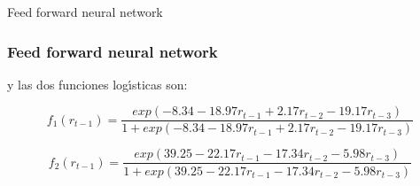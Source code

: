 \documentclass[spanish,xcolor=table]{beamer}
\begin{document}
\begin{section}{Feed forward neural network}
\begin{frame}
\frametitle{Feed forward neural network}

y las dos funciones log\'{\i}sticas son:

\begin{equation*} 
f_1(r_{t-1}) = \frac { exp (-8.34 -18.97r_{t-1} + 2.17 r_{t-2} -19.17 r_{t-3})}{1 + exp(-8.34 -18.97r_{t-1} + 2.17 r_{t-2} -19.17 r_{t-3})}  
\end{equation*}

\begin{equation*} 
f_2(r_{t-1}) = \frac { exp (39.25 -22.17 r_{t-1} - 17.34 r_{t-2} -5.98 r_{t-3})}{1 + exp (39.25 -22.17 r_{t-1} - 17.34 r_{t-2} -5.98 r_{t-3})}  
\end{equation*}


\end{frame}
\end{section}
\end{document}
